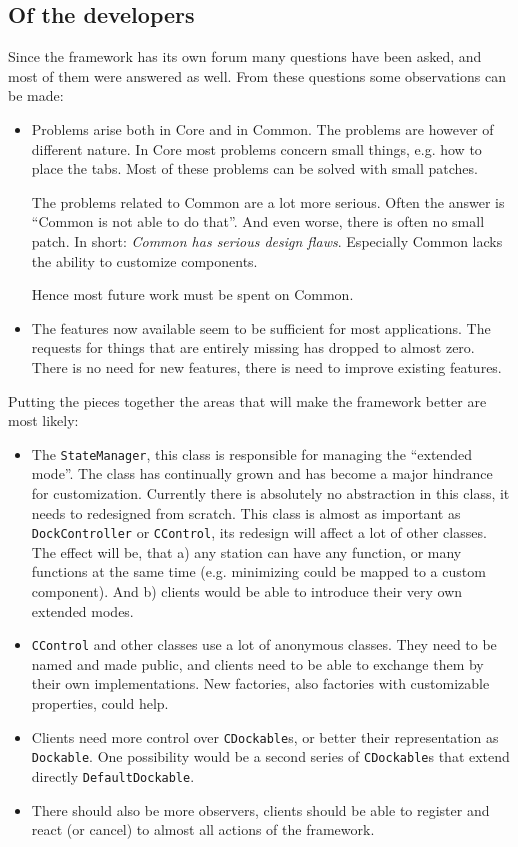 \documentclass[a4paper,10pt]{article}
\newcommand{\src}[1]{\texttt{#1}}
\begin{document}
\subsection{Of the developers}
Since the framework has its own forum many questions have been asked, and most of them were answered as well. From these questions some observations can be made:

\begin{itemize}
 \item Problems arise both in Core and in Common. The problems are however of different nature. In Core most problems concern small things, e.g. how to place the tabs. Most of these problems can be solved with small patches. 
 
 The problems related to Common are a lot more serious. Often the answer is ``Common is not able to do that''. And even worse, there is often no small patch. In short: \textit{Common has serious design flaws}. Especially Common lacks the ability to customize components.
 
 Hence most future work must be spent on Common.
 
 \item The features now available seem to be sufficient for most applications. The requests for things that are entirely missing has dropped to almost zero. There is no need for new features, there is need to improve existing features.
\end{itemize}

Putting the pieces together the areas that will make the framework better are most likely:
\begin{itemize}
 \item The \src{StateManager}, this class is responsible for managing the ``extended mode''. The class has continually grown and has become a major hindrance for customization. Currently there is absolutely no abstraction in this class, it needs to redesigned from scratch. This class is almost as important as \src{DockController} or \src{CControl}, its redesign will affect a lot of other classes. The effect will be, that a) any station can have any function, or many functions at the same time (e.g. minimizing could be mapped to a custom component). And b) clients would be able to introduce their very own extended modes.
 \item \src{CControl} and other classes use a lot of anonymous classes. They need to be named and made public, and clients need to be able to exchange them by their own implementations. New factories, also factories with customizable properties, could help.
 \item Clients need more control over \src{CDockable}s, or better their representation as \src{Dockable}. One possibility would be a second series of \src{CDockable}s that extend directly \src{DefaultDockable}.
 \item There should also be more observers, clients should be able to register and react (or cancel) to almost all actions of the framework.
\end{itemize}
\end{document}
